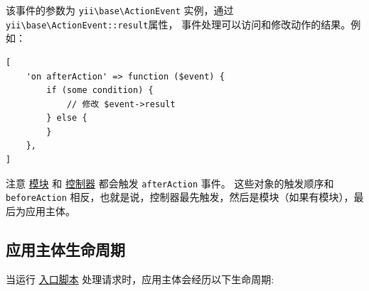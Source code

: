 该事件的参数为 \texttt{yii{\allowbreak{}\textbackslash}base{\allowbreak{}\textbackslash}ActionEvent} 实例，通过\texttt{yii{\allowbreak{}\textbackslash}base{\allowbreak{}\textbackslash}ActionEvent\allowbreak{}::\allowbreak{}result}属性，
事件处理可以访问和修改动作的结果。例如：

\lstset{language=php}\begin{lstlisting}
[
    'on afterAction' => function ($event) {
        if (some condition) {
            // 修改 $event->result
        } else {
        }
    },
]
\end{lstlisting}
注意 \hyperref[structure-modules.md]{模块} 和 \hyperref[structure-controllers.md]{控制器} 都会触发 \lstinline|afterAction| 事件。
这些对象的触发顺序和 \lstinline|beforeAction| 相反，也就是说，控制器最先触发，然后是模块（如果有模块），最后为应用主体。

\subsection{应用主体生命周期 \label{structure-applications.md::application-lifecycle}}
当运行 \hyperref[structure-entry-scripts.md]{入口脚本} 处理请求时，应用主体会经历以下生命周期:

